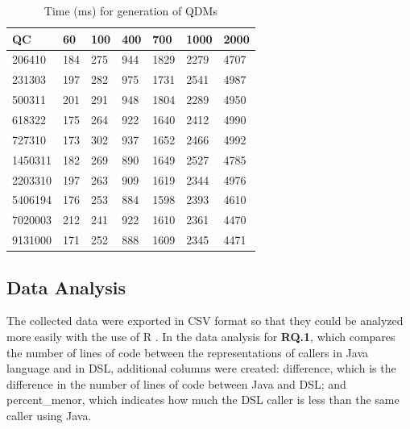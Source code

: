 \begin{table}[htb!]
\centering
\caption{Time (ms) for generation of QDMs}
\label{table:tempo}
\begin{center}
\begin{tabular}{|l|l|l|l|l|l|l|}
\hline
\textbf{QC}      & \textbf{60}  & \textbf{100} & \textbf{400}  & \textbf{700}  & \textbf{1000} & \textbf{2000} \\ \hline

206410  & 184 & 275 & 944  & 1829 & 2279 & 4707 \\ \hline
231303  & 197 & 282 & 975  & 1731 & 2541 & 4987 \\ \hline
500311  & 201 & 291 & 948  & 1804 & 2289 & 4950 \\ \hline
618322  & 175 & 264 & 922  & 1640 & 2412 & 4990 \\ \hline
727310  & 173 & 302 & 937  & 1652 & 2466 & 4992 \\ \hline
1450311 & 182 & 269 & 890  & 1649 & 2527 & 4785 \\ \hline
2203310 & 197 & 263 & 909  & 1619 & 2344 & 4976 \\ \hline
5406194 & 176 & 253 & 884  & 1598 & 2393 & 4610 \\ \hline
7020003 & 212 & 241 & 922  & 1610 & 2361 & 4470 \\ \hline
9131000 & 171 & 252 & 888  & 1609 & 2345 & 4471 \\ \hline
\end{tabular}
\end{center}
\end{table}

\subsection{Data Analysis}


The collected data were exported in CSV format so that they could be analyzed more easily with the use of R \cite{crawley2013}. In the data analysis for \textbf{RQ.1}, which compares the number of lines of code between the representations of callers in Java language and in DSL, additional columns were created: difference, which is the difference in the number of lines of code between Java and DSL; and percent\_menor, which indicates how much the DSL caller is less than the same caller using Java.

